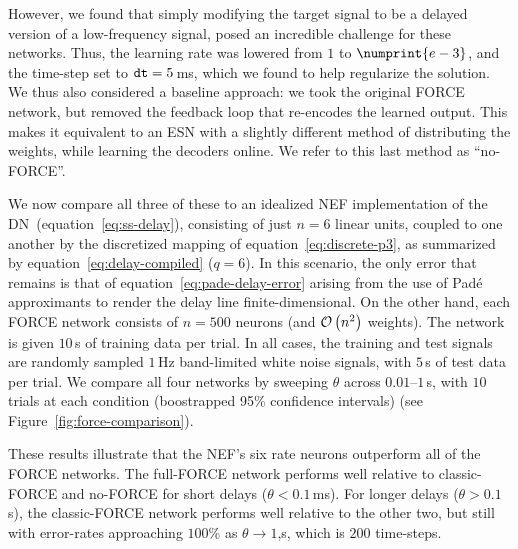 However, we found that simply modifying the target signal to be a delayed version of a low-frequency signal, posed an incredible challenge for these networks.
Thus, the learning rate was lowered from $1$ to $\numprint{e-3}$, and the time-step set to $\texttt{dt}{} = 5$\,ms, which we found to help regularize the solution.
We thus also considered a baseline approach:
we took the original FORCE network, but removed the feedback loop that re-encodes the learned output.
This makes it equivalent to an ESN with a slightly different method of distributing the weights, while learning the decoders online.
We refer to this last method as ``no-FORCE''.

We now compare all three of these to an idealized NEF implementation of the DN~(equation~\ref{eq:ss-delay}), consisting of just $n = 6$ linear units, coupled to one another by the discretized mapping of equation~\ref{eq:discrete-p3}, as summarized by equation~\ref{eq:delay-compiled} ($q = 6$).
In this scenario, the only error that remains is that of equation~\ref{eq:pade-delay-error} arising from the use of Pad\'e approximants to render the delay line finite-dimensional.
On the other hand, each FORCE network consists of $n = 500$ neurons (and $\mathcal{O}\left({n^2}\right)$ weights).
The network is given $10$\,s of training data per trial.
In all cases, the training and test signals are randomly sampled $1$\,Hz band-limited white noise signals, with $5$\,s of test data per trial.
We compare all four networks by sweeping $\theta$ across $0.01$--$1$\,s, with $10$ trials at each condition (boostrapped 95\% confidence intervals) (see Figure~\ref{fig:force-comparison}).



These results illustrate that the NEF's six rate neurons outperform all of the FORCE networks.
The full-FORCE network performs well relative to classic-FORCE and no-FORCE for short delays ($\theta < 0.1$\,ms).
For longer delays ($\theta > 0.1$\,s), the classic-FORCE network performs well relative to the other two, but still with error-rates approaching $100$\% as $\theta \rightarrow 1$,s, which is $200$ time-steps.

